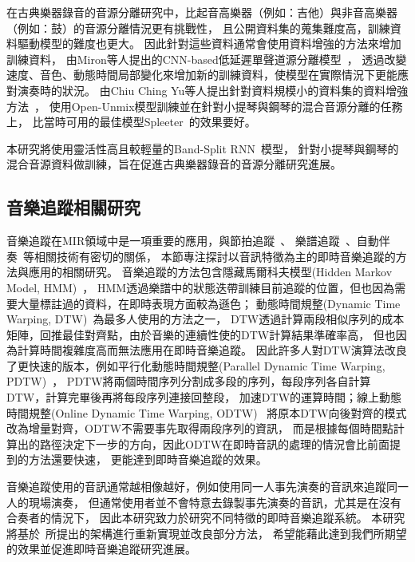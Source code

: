 \documentclass[class=NCU_thesis, crop=false]{standalone}
\begin{document}
在古典樂器錄音的音源分離研究中，比起音高樂器（例如：吉他）與非音高樂器（例如：鼓）的音源分離情況更有挑戰性，
且公開資料集的蒐集難度高，訓練資料驅動模型的難度也更大。
因此針對這些資料通常會使用資料增強的方法來增加訓練資料，
由Miron等人提出的CNN-based低延遲單聲道源分離模型~\cite{miron2017generating}，
透過改變速度、音色、動態時間局部變化來增加新的訓練資料，使模型在實際情況下更能應對演奏時的狀況。
由Chiu Ching Yu等人提出針對資料規模小的資料集的資料增強方法~\cite{Chiu_ChingYu2020MixingSpecific}，
使用Open-Unmix模型訓練並在針對小提琴與鋼琴的混合音源分離的任務上，
比當時可用的最佳模型Spleeter~\cite{hennequin2020spleeter}的效果要好。

本研究將使用靈活性高且較輕量的Band-Split RNN~\cite{Luo_Yi2022MusicSourceSeparation}模型，
針對小提琴與鋼琴的混合音源資料做訓練，旨在促進古典樂器錄音的音源分離研究進展。


\subsection{音樂追蹤相關研究}
音樂追蹤在MIR領域中是一項重要的應用，與節拍追蹤~\cite{heydari2021don, goto2021musical, di2021downbeat}、
樂譜追蹤~\cite{henkel2019score}、自動伴奏~\cite{zhang2023design}等相關技術有密切的關係，
本節專注探討以音訊特徵為主的即時音樂追蹤的方法與應用的相關研究。
音樂追蹤的方法包含隱藏馬爾科夫模型(Hidden Markov Model, HMM)~\cite{cano1999score}，
HMM透過樂譜中的狀態迭帶訓練目前追蹤的位置，但也因為需要大量標註過的資料，在即時表現方面較為遜色；
動態時間規整(Dynamic Time Warping, DTW)~\cite{Arzt2012Adaptive, Raffel2016Optimizing}為最多人使用的方法之一，
DTW透過計算兩段相似序列的成本矩陣，回推最佳對齊點，由於音樂的連續性使的DTW計算結果準確率高，
但也因為計算時間複雜度高而無法應用在即時音樂追蹤。
因此許多人對DTW演算法改良了更快速的版本，例如平行化動態時間規整(Parallel Dynamic Time Warping, PDTW)~\cite{Wei2018Online}，
PDTW將兩個時間序列分割成多段的序列，每段序列各自計算DTW，計算完畢後再將每段序列連接回整段，
加速DTW的運算時間；線上動態時間規整(Online Dynamic Time Warping, ODTW)~\cite{dixon2005ODTW, Arzt2010Towards, Lin2020AHumanComputerDuetSystem}
將原本DTW向後對齊的模式改為增量對齊，ODTW不需要事先取得兩段序列的資訊，
而是根據每個時間點計算出的路徑決定下一步的方向，因此ODTW在即時音訊的處理的情況會比前面提到的方法還要快速，
更能達到即時音樂追蹤的效果。

音樂追蹤使用的音訊通常越相像越好，例如使用同一人事先演奏的音訊來追蹤同一人的現場演奏，
但通常使用者並不會特意去錄製事先演奏的音訊，尤其是在沒有合奏者的情況下，
因此本研究致力於研究不同特徵的即時音樂追蹤系統。
本研究將基於~\cite{Lin2020AHumanComputerDuetSystem}所提出的架構進行重新實現並改良部分方法，
希望能藉此達到我們所期望的效果並促進即時音樂追蹤研究進展。


\pagebreak
\end{document}
